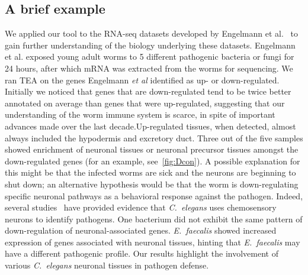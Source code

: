 \documentclass{bmcart}
\newcommand{\ignore}[2]{\hspace{0in}#2}
\begin{document}
\subsection*{A brief example}
We applied our tool to the RNA-seq datasets developed by Engelmann et al.~\cite{Engelmann2011} to gain further understanding of the biology underlying these datasets. Engelmann et al. exposed young adult worms to 5 different pathogenic bacteria or fungi for 24 hours, after which mRNA was extracted from the worms for sequencing. We ran TEA on the genes Engelmann \emph{et al} identified as up- or down-regulated. Initially we noticed that genes that are down-regulated tend to be twice better annotated on average than genes that were up-regulated, suggesting that our understanding of the worm immune system is scarce, in spite of important advances made over the last decade.Up-regulated tissues, when detected, almost always included the hypodermis and excretory duct. Three out of the five samples showed enrichment of neuronal tissues or neuronal precursor tissues amongst the down-regulated genes (for an example, see~\ref{fig:Dcon}\ignore{,~\ref{fig:Hsp},\ref{fig:Smar}}). A possible explanation for this might be that the infected worms are sick and the neurons are beginning to shut down; an alternative hypothesis would be that the worm is down-regulating specific neuronal pathways as a behavioral response against the pathogen. Indeed, several studies~\cite{Meisel2014, Zhang2005} have provided evidence that \emph{C.~elegans} uses chemosensory neurons to identify pathogens. One bacterium did not exhibit the same pattern of down-regulation of neuronal-associated genes. \emph{E.~faecalis} showed increased expression of genes associated with neuronal tissues, hinting that \emph{E.~faecalis} may have a different pathogenic profile. Our results highlight the involvement of various \emph{C.~elegans} neuronal tissues in pathogen defense.
\end{document}
